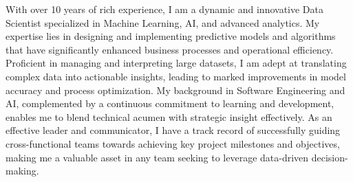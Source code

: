 %
%
%
\par{
With over 10 years of rich experience, I am a dynamic and innovative Data Scientist specialized in Machine Learning, AI, and advanced analytics. My expertise lies in designing and implementing predictive models and algorithms that have significantly enhanced business processes and operational efficiency. Proficient in managing and interpreting large datasets, I am adept at translating complex data into actionable insights, leading to marked improvements in model accuracy and process optimization. My background in Software Engineering and AI, complemented by a continuous commitment to learning and development, enables me to blend technical acumen with strategic insight effectively. As an effective leader and communicator, I have a track record of successfully guiding cross-functional teams towards achieving key project milestones and objectives, making me a valuable asset in any team seeking to leverage data-driven decision-making.
}
\vspace{6.6mm}
